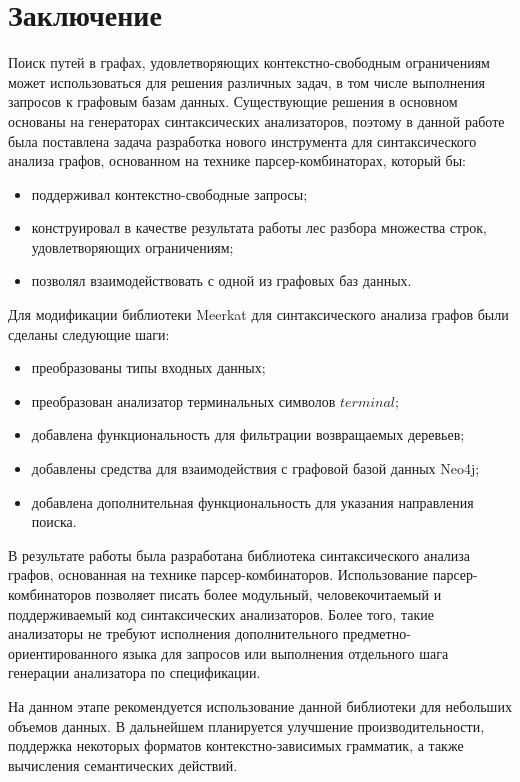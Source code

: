 \section*{Заключение}
Поиск путей в графах, удовлетворяющих контекстно-свободным ограничениям может использоваться для решения различных задач, в том числе выполнения запросов к графовым базам данных. Существующие решения в основном основаны на генераторах синтаксических анализаторов, поэтому в данной работе была поставлена задача разработка нового инструмента для синтаксического анализа графов, основанном на технике парсер-комбинаторах, который бы:

\begin{itemize}
\item поддерживал контекстно-свободные запросы;
\item конструировал в качестве результата работы лес разбора множества строк, удовлетворяющих ограничениям;
\item позволял взаимодействовать с одной из графовых баз данных.
\end{itemize}

Для модификации библиотеки Meerkat для синтаксического анализа графов были сделаны следующие шаги:
\begin{itemize}
\item преобразованы типы входных данных;
\item преобразован анализатор терминальных символов $terminal$;
\item добавлена функциональность для фильтрации возвращаемых деревьев;
\item добавлены средства для взаимодействия с графовой базой данных Neo4j;
\item добавлена дополнительная функциональность для указания направления поиска.
\end{itemize}

В результате работы была разработана библиотека синтаксического анализа графов, основанная на технике парсер-комбинаторов. Использование парсер-комбинаторов позволяет писать более модульный, человекочитаемый и поддерживаемый код синтаксических анализаторов. Более того, такие анализаторы не требуют исполнения дополнительного предметно-ориентированного языка для запросов или выполнения отдельного шага генерации анализатора по спецификации.

На данном этапе рекомендуется использование данной библиотеки для небольших объемов данных. В дальнейшем планируется улучшение производительности, поддержка некоторых форматов контекстно-зависимых грамматик, а также вычисления семантических действий.